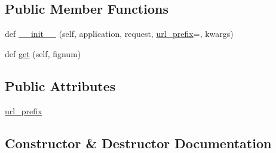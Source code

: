 \subsection*{Public Member Functions}
\begin{DoxyCompactItemize}
\item 
def \hyperlink{classmatplotlib_1_1backends_1_1backend__webagg_1_1WebAggApplication_1_1SingleFigurePage_af18865b9b7845f82bbde8aece93b598a}{\+\_\+\+\_\+init\+\_\+\+\_\+} (self, application, request, \hyperlink{classmatplotlib_1_1backends_1_1backend__webagg_1_1WebAggApplication_1_1SingleFigurePage_a2af057ae2b13f7a87131432932fcb194}{url\+\_\+prefix}=\textquotesingle{}\textquotesingle{}, kwargs)
\item 
def \hyperlink{classmatplotlib_1_1backends_1_1backend__webagg_1_1WebAggApplication_1_1SingleFigurePage_a248e4bf344a0d7d169d95f37cf06ff2e}{get} (self, fignum)
\end{DoxyCompactItemize}
\subsection*{Public Attributes}
\begin{DoxyCompactItemize}
\item 
\hyperlink{classmatplotlib_1_1backends_1_1backend__webagg_1_1WebAggApplication_1_1SingleFigurePage_a2af057ae2b13f7a87131432932fcb194}{url\+\_\+prefix}
\end{DoxyCompactItemize}


\subsection{Constructor \& Destructor Documentation}
\mbox{\label{classmatplotlib_1_1backends_1_1backend__webagg_1_1WebAggApplication_1_1SingleFigurePage_af18865b9b7845f82bbde8aece93b598a}} 
